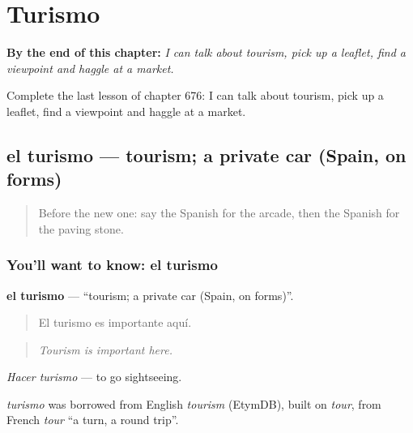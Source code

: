 
\chapter{Turismo}
\label{ch:es-turismo}

\begin{chapteropening}
\textbf{By the end of this chapter:} \emph{I can talk about tourism, pick up a leaflet, find a viewpoint and haggle at a market.}

Complete the last lesson of chapter 676: I can talk about tourism, pick up a leaflet, find a viewpoint and haggle at a market.
\end{chapteropening}

\section[el turismo]{el turismo — tourism; a private car (Spain, on forms)}

\label{lesson:ES-C676-turismo}



\begin{quote}
Before the new one: say the Spanish for the arcade, then the Spanish for the paving stone.
\end{quote}

\subsection*{You'll want to know: el turismo}
\textbf{el turismo} — \textquotedblleft{}tourism; a private car (Spain, on forms)\textquotedblright{}.

\begin{quote}
El turismo es importante aquí.
\end{quote}

\begin{quote}
\emph{Tourism is important here.}
\end{quote}

\emph{Hacer turismo} — to go sightseeing.

\begin{cousinweb}
\emph{turismo} was borrowed from English \emph{tourism} (EtymDB), built on \emph{tour}, from French \emph{tour} \textquotedblleft{}a turn, a round trip\textquotedblright{}.
\end{cousinweb}

